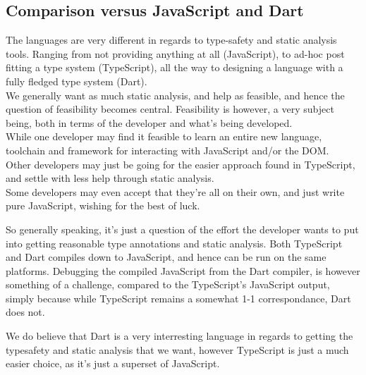 \subsection*{Comparison versus JavaScript and Dart}
The languages are very different in regards to type-safety and static analysis tools.
Ranging from not providing anything at all (JavaScript), to ad-hoc post fitting a type system (TypeScript), all the way to designing a language with a fully fledged type system (Dart).
\\
We generally want as much static analysis, and help as feasible, and hence the question of feasibility becomes central.
Feasibility is however, a very subject being, both in terms of the developer and what's being developed.
\\
While one developer may find it feasible to learn an entire new language, toolchain and framework for interacting with JavaScript and/or the DOM.
\\
Other developers may just be going for the easier approach found in TypeScript, and settle with less help through static analysis.
\\
Some developers may even accept that they're all on their own, and just write pure JavaScript, wishing for the best of luck.

So generally speaking, it's just a question of the effort the developer wants to put into getting reasonable type annotations and static analysis.
Both TypeScript and Dart compiles down to JavaScript, and hence can be run on the same platforms.
Debugging the compiled JavaScript from the Dart compiler, is however something of a challenge, compared to the TypeScript's JavaScript output, simply because while TypeScript remains a somewhat 1-1 correspondance, Dart does not.

We do believe that Dart is a very interresting language in regards to getting the typesafety and static analysis that we want, however TypeScript is just a much easier choice, as it's just a superset of JavaScript.
